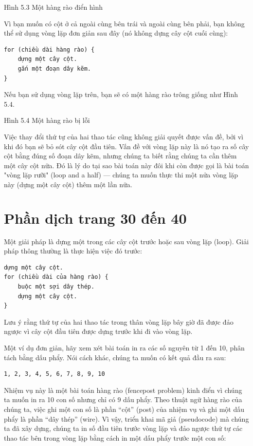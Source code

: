 Hình 5.3 Một hàng rào điển hình

Vì bạn muốn có cột ở cả ngoài cùng bên trái và ngoài cùng bên phải, bạn không thể sử dụng vòng lặp đơn giản sau đây (nó không dựng cây cột cuối cùng):

\begin{verbatim}
for (chiều dài hàng rào) {
    dựng một cây cột.
    gắn một đoạn dây kẽm.
}
\end{verbatim}

Nếu bạn sử dụng vòng lặp trên, bạn sẽ có một hàng rào trông giống như Hình 5.4.

Hình 5.4 Một hàng rào bị lỗi

Việc thay đổi thứ tự của hai thao tác cũng không giải quyết được vấn đề, bởi vì khi đó bạn sẽ bỏ sót cây cột đầu tiên. Vấn đề với vòng lặp này là nó tạo ra số cây cột bằng đúng số đoạn dây kẽm, nhưng chúng ta biết rằng chúng ta cần thêm một cây cột nữa. Đó là lý do tại sao bài toán này đôi khi còn được gọi là bài toán "vòng lặp rưỡi" (loop and a half) — chúng ta muốn thực thi một nửa vòng lặp này (dựng một cây cột) thêm một lần nữa.
\section{Phần dịch trang 30 đến 40}
Một giải pháp là dựng một trong các cây cột trước hoặc sau vòng lặp (loop). Giải pháp thông thường là thực hiện việc đó trước:

\begin{verbatim}
dựng một cây cột.
for (chiều dài của hàng rào) {
    buộc một sợi dây thép.
    dựng một cây cột.
}
\end{verbatim}


Lưu ý rằng thứ tự của hai thao tác trong thân vòng lặp bây giờ đã được đảo ngược vì cây cột đầu tiên được dựng trước khi đi vào vòng lặp.

Một ví dụ đơn giản, hãy xem xét bài toán in ra các số nguyên từ 1 đến 10, phân tách bằng dấu phẩy. Nói cách khác, chúng ta muốn có kết quả đầu ra sau:
 
\begin{verbatim}
1, 2, 3, 4, 5, 6, 7, 8, 9, 10 
\end{verbatim}


Nhiệm vụ này là một bài toán hàng rào (fencepost problem) kinh điển vì chúng ta muốn in ra 10 con số nhưng chỉ có 9 dấu phẩy. Theo thuật ngữ hàng rào của chúng ta, việc ghi một con số là phần ``cột'' (post) của nhiệm vụ và ghi một dấu phẩy là phần ``dây thép'' (wire). Vì vậy, triển khai mã giả (pseudocode) mà chúng ta đã xây dựng, chúng ta in số đầu tiên trước vòng lặp và đảo ngược thứ tự các thao tác bên trong vòng lặp bằng cách in một dấu phẩy trước một con số:

